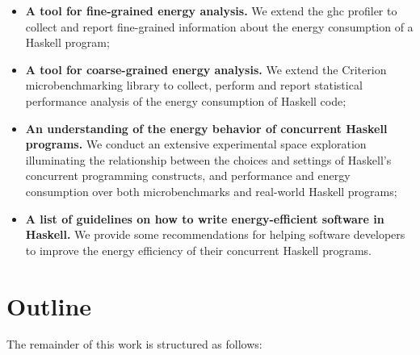 \begin{itemize}
  \item \textbf{A tool for fine-grained energy analysis.} We extend the \acs{ghc} profiler to collect and report fine-grained information about the energy consumption of a Haskell program;
  \item \textbf{A tool for coarse-grained energy analysis.} We extend the Criterion microbenchmarking library to collect, perform and report statistical performance analysis of the energy consumption of Haskell code;
  \item \textbf{An understanding of the energy behavior of concurrent Haskell programs.} We conduct an extensive experimental space exploration illuminating the relationship between the choices and settings of Haskell's concurrent programming constructs, and performance and energy consumption over both microbenchmarks and real-world Haskell programs;
  \item \textbf{A list of guidelines on how to write energy-efficient software in Haskell.} We provide some recommendations for helping software developers to improve the energy efficiency of their concurrent Haskell programs.
\end{itemize}

\section{Outline}
The remainder of this work is structured as follows:

